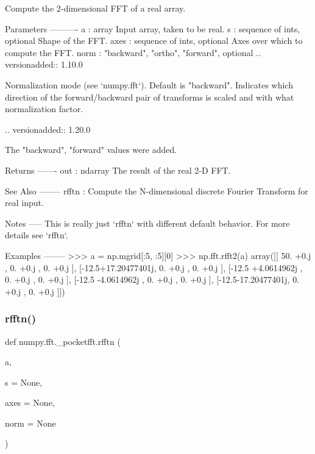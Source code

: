 \begin{DoxyVerb}Compute the 2-dimensional FFT of a real array.

Parameters
----------
a : array
    Input array, taken to be real.
s : sequence of ints, optional
    Shape of the FFT.
axes : sequence of ints, optional
    Axes over which to compute the FFT.
norm : {"backward", "ortho", "forward"}, optional
    .. versionadded:: 1.10.0

    Normalization mode (see `numpy.fft`). Default is "backward".
    Indicates which direction of the forward/backward pair of transforms
    is scaled and with what normalization factor.

    .. versionadded:: 1.20.0

        The "backward", "forward" values were added.

Returns
-------
out : ndarray
    The result of the real 2-D FFT.

See Also
--------
rfftn : Compute the N-dimensional discrete Fourier Transform for real
        input.

Notes
-----
This is really just `rfftn` with different default behavior.
For more details see `rfftn`.

Examples
--------
>>> a = np.mgrid[:5, :5][0]
>>> np.fft.rfft2(a)
array([[ 50.  +0.j        ,   0.  +0.j        ,   0.  +0.j        ],
       [-12.5+17.20477401j,   0.  +0.j        ,   0.  +0.j        ],
       [-12.5 +4.0614962j ,   0.  +0.j        ,   0.  +0.j        ],
       [-12.5 -4.0614962j ,   0.  +0.j        ,   0.  +0.j        ],
       [-12.5-17.20477401j,   0.  +0.j        ,   0.  +0.j        ]])
\end{DoxyVerb}
 \mbox{\label{namespacenumpy_1_1fft_1_1__pocketfft_a921c321f6cc9f4ca23fdf9549c24f0ad}} 
\subsubsection{\texorpdfstring{rfftn()}{rfftn()}}
{\footnotesize\ttfamily def numpy.\+fft.\+\_\+pocketfft.\+rfftn (\begin{DoxyParamCaption}\item[{}]{a,  }\item[{}]{s = {\ttfamily None},  }\item[{}]{axes = {\ttfamily None},  }\item[{}]{norm = {\ttfamily None} }\end{DoxyParamCaption})}


